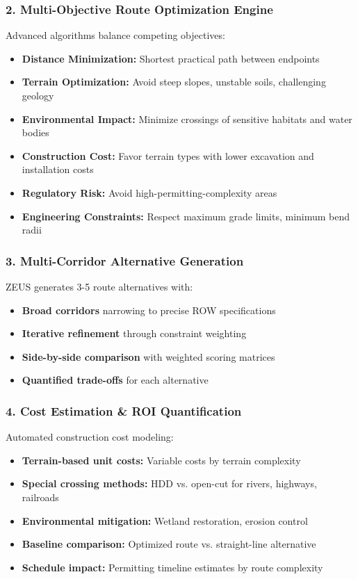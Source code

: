 \documentclass[11pt,letterpaper]{article}
\begin{document}
\subsubsection{2. Multi-Objective Route Optimization Engine}

Advanced algorithms balance competing objectives:

\begin{itemize}[leftmargin=*]
    \item \textbf{Distance Minimization:} Shortest practical path between endpoints
    \item \textbf{Terrain Optimization:} Avoid steep slopes, unstable soils, challenging geology
    \item \textbf{Environmental Impact:} Minimize crossings of sensitive habitats and water bodies
    \item \textbf{Construction Cost:} Favor terrain types with lower excavation and installation costs
    \item \textbf{Regulatory Risk:} Avoid high-permitting-complexity areas
    \item \textbf{Engineering Constraints:} Respect maximum grade limits, minimum bend radii
\end{itemize}

\subsubsection{3. Multi-Corridor Alternative Generation}

ZEUS generates 3-5 route alternatives with:

\begin{itemize}[leftmargin=*]
    \item \textbf{Broad corridors} narrowing to precise ROW specifications
    \item \textbf{Iterative refinement} through constraint weighting
    \item \textbf{Side-by-side comparison} with weighted scoring matrices
    \item \textbf{Quantified trade-offs} for each alternative
\end{itemize}

\subsubsection{4. Cost Estimation \& ROI Quantification}

Automated construction cost modeling:

\begin{itemize}[leftmargin=*]
    \item \textbf{Terrain-based unit costs:} Variable costs by terrain complexity
    \item \textbf{Special crossing methods:} HDD vs. open-cut for rivers, highways, railroads
    \item \textbf{Environmental mitigation:} Wetland restoration, erosion control
    \item \textbf{Baseline comparison:} Optimized route vs. straight-line alternative
    \item \textbf{Schedule impact:} Permitting timeline estimates by route complexity
\end{itemize}
\end{document}
